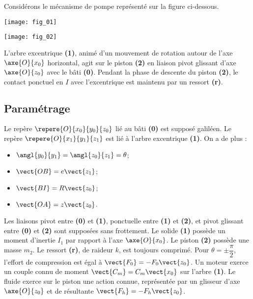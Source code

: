 \ifprof
\else
\begin{multicols}{2}
\fi


\ifprof
\else

Considérons le mécanisme de pompe représenté sur la figure ci-dessous.

\begin{center}
\texttt{[image: fig\_01]}
\end{center}


\begin{center}
\texttt{[image: fig\_02]}
\end{center}

L'arbre excentrique \textbf{(1)}, animé d'un mouvement de rotation autour de l'axe $\axe{O}{x_0}$  horizontal, agit sur le piston \textbf{(2)} en liaison pivot glissant d'axe $\axe{O}{z_0}$ avec le bâti \textbf{(0)}. Pendant la phase de descente du piston \textbf{(2)}, le contact ponctuel en $I$ avec l’excentrique est maintenu par un ressort \textbf{(r)}.

\subsection*{Paramétrage}
Le repère $\repere{O}{x_0}{y_0}{z_0}$ lié au bâti \textbf{(0)} est supposé galiléen.
Le repère $\repere{O}{x_1}{y_1}{z_1}$ est lié à l'arbre excentrique \textbf{(1)}.
On a de plus :
\begin{itemize}
\item $\angl{y_0}{y_1}=\angl{z_0}{z_1}=\theta$;
\item $\vect{OB}=e\vect{z_1}$;
\item $\vect{BI}=R\vect{z_0}$;
\item $\vect{OA}=z\vect{z_0}$. 
\end{itemize} 	 	 		 
Les liaisons pivot entre \textbf{(0)} et \textbf{(1)}, ponctuelle entre \textbf{(1)} et \textbf{(2)}, et pivot glissant entre \textbf{(0)} et \textbf{(2)} sont supposées sans frottement.
Le solide \textbf{(1)} possède un moment d’inertie $I_1$ par rapport à l'axe $\axe{O}{x_0}$. Le piston \textbf{(2)} possède une masse $m_2$.
Le ressort \textbf{(r)}, de raideur $k$, est toujours comprimé. Pour $\theta = \pm \dfrac{\pi}{2}$, l'effort de compression est égal à $\vect{F_0}=-F_0\vect{z_0}$.
Un moteur exerce un couple connu de moment $\vect{C_m}=C_m\vect{x_0}$ sur l'arbre \textbf{(1)}. Le fluide exerce sur le piston une action connue, représentée par un glisseur d'axe $\axe{O}{z_0}$ et de résultante $\vect{F_h}=-F_h{\vect{z_0}}$.


\end{multicols}
